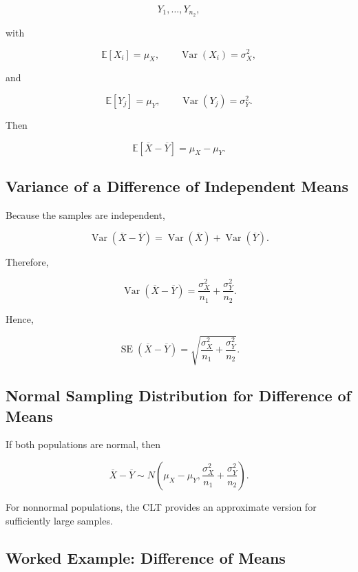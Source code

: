 \[
Y_1,\ldots,Y_{n_2},
\]

with

\[
\mathbb{E}[X_i]=\mu_X,
\qquad
\operatorname{Var}(X_i)=\sigma_X^2,
\]

and

\[
\mathbb{E}[Y_j]=\mu_Y,
\qquad
\operatorname{Var}(Y_j)=\sigma_Y^2.
\]

Then

\[
\boxed{
\mathbb{E}
[
\overline{X}-\overline{Y}
]
=
\mu_X-\mu_Y.
}
\]

\subsection{Variance of a Difference of Independent Means}
\label{subsec:variance-difference-means}

Because the samples are independent,

\[
\operatorname{Var}
(
\overline{X}-\overline{Y}
)
=
\operatorname{Var}(\overline{X})
+
\operatorname{Var}(\overline{Y}).
\]

Therefore,

\[
\boxed{
\operatorname{Var}
(
\overline{X}-\overline{Y}
)
=
\frac{
\sigma_X^2
}{
n_1
}
+
\frac{
\sigma_Y^2
}{
n_2
}.
}
\]

Hence,

\[
\boxed{
\operatorname{SE}
(
\overline{X}-\overline{Y}
)
=
\sqrt{
\frac{
\sigma_X^2
}{
n_1
}
+
\frac{
\sigma_Y^2
}{
n_2
}
}.
}
\]

\subsection{Normal Sampling Distribution for Difference of Means}
\label{subsec:normal-difference-means}

If both populations are normal, then

\[
\boxed{
\overline{X}-\overline{Y}
\sim
N
\left(
\mu_X-\mu_Y,
\frac{
\sigma_X^2
}{
n_1
}
+
\frac{
\sigma_Y^2
}{
n_2
}
\right).
}
\]

For nonnormal populations, the CLT provides an approximate version for
sufficiently large samples.

\subsection{Worked Example: Difference of Means}
\label{subsec:worked-difference-means}

